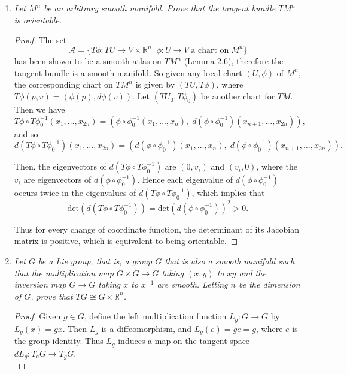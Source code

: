 \documentclass{article}
\begin{document}
\begin{enumerate}[label={\bf Q\arabic*:}]
  \item \it Let $M^n$ be an arbitrary smooth manifold. Prove that the tangent
    bundle $TM^n$ is orientable.

    \begin{proof}
      The set 
      \[\mathcal{A} = \{T\phi:TU\rightarrow V\times\mathbb{R}^n|\;
        \phi:U\rightarrow V\; \text{a chart on}\; M^n\}\]
      has been shown to be a smooth atlas on $TM^n$ (Lemma 2.6), therefore
      the tangent bundle is a smooth manifold. So given any local chart
      $(U,\phi)$ of $M^n$, the corresponding chart on $TM^n$ is given by
      $(TU,T\phi)$, where $T\phi(p,v)=(\phi(p),d\phi(v))$. Let
      $(TU_0,T\phi_0)$ be another chart for $TM$. Then we have
      \[T\phi\circ T\phi_0^{-1}(x_1,\ldots,x_{2n})
        =(\phi\circ\phi_0^{-1}(x_1,\ldots,x_n),\; d(\phi\circ\phi_0^{-1})
        (x_{n+1},\ldots,x_{2n})),\]
      and so
      \[d(T\phi\circ T\phi_0^{-1})(x_{1},\ldots,x_{2n})
        =(d(\phi\circ\phi_0^{-1})(x_{1},\ldots,x_{n}),\;
        d(\phi\circ\phi_0^{-1})(x_{n+1},\ldots,x_{2n})).\]

      Then, the eigenvectors of $d(T\phi\circ T\phi_0^{-1})$ are $(0,v_i)$
      and $(v_i,0)$, where the $v_i$ are eigenvectors of
      $d(\phi\circ\phi_0^{-1})$. Hence each eigenvalue of
      $d(\phi\circ\phi_0^{-1})$ occurs twice in the eigenvalues of
      $d(T\phi\circ T\phi_0^{-1})$, which implies that
      \[\text{det}(d(T\phi\circ T\phi_0^{-1}))
      =\text{det}(d(\phi\circ\phi_0^{-1}))^2 >0.\]

      Thus for every change of coordinate function, the determinant of its
      Jacobian matrix is positive, which is equivalent to being orientable.
    \end{proof}

  \item \it Let $G$ be a Lie group, that is, a group $G$ that is also a
    smooth manifold such that the multiplication map $G\times G\rightarrow
    G$ taking $(x,y)$ to $xy$ and the inversion map $G\rightarrow G$ taking
    $x$ to $x^{-1}$ are smooth. Letting $n$ be the dimension of $G$, prove
    that $TG\cong G\times\mathbb{R}^n$.

    \begin{proof}
      Given $g\in G$, define the left multiplication function
      $L_g:G\rightarrow G$ by $L_g(x)=gx$. Then $L_g$ is a diffeomorphism,
      and $L_g(e)=ge=g$, where $e$ is the group identity. Thus $L_g$
      induces a map on the tangent space $dL_g:T_eG\rightarrow T_gG$.  \\


\end{proof}
\end{enumerate}
\end{document}
